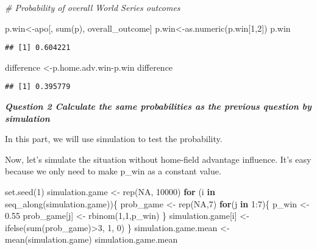 \documentclass[
]{article}
\newenvironment{Shaded}{\begin{snugshade}}{\end{snugshade}}
\newcommand{\CommentTok}[1]{\textcolor[rgb]{0.56,0.35,0.01}{\textit{#1}}}
\newcommand{\ConstantTok}[1]{\textcolor[rgb]{0.00,0.00,0.00}{#1}}
\newcommand{\ControlFlowTok}[1]{\textcolor[rgb]{0.13,0.29,0.53}{\textbf{#1}}}
\newcommand{\DecValTok}[1]{\textcolor[rgb]{0.00,0.00,0.81}{#1}}
\newcommand{\FloatTok}[1]{\textcolor[rgb]{0.00,0.00,0.81}{#1}}
\newcommand{\FunctionTok}[1]{\textcolor[rgb]{0.00,0.00,0.00}{#1}}
\newcommand{\NormalTok}[1]{#1}
\newcommand{\OtherTok}[1]{\textcolor[rgb]{0.56,0.35,0.01}{#1}}
\newcommand{\SpecialCharTok}[1]{\textcolor[rgb]{0.00,0.00,0.00}{#1}}
\begin{document}
\begin{Shaded}
\begin{Highlighting}[]
\CommentTok{\# Probability of overall World Series outcomes}

\NormalTok{p.win}\OtherTok{\textless{}{-}}\NormalTok{apo[, }\FunctionTok{sum}\NormalTok{(p), overall\_outcome]}
\NormalTok{p.win}\OtherTok{\textless{}{-}}\FunctionTok{as.numeric}\NormalTok{(p.win[}\DecValTok{1}\NormalTok{,}\DecValTok{2}\NormalTok{])}
\NormalTok{p.win}
\end{Highlighting}
\end{Shaded}

\begin{verbatim}
## [1] 0.604221
\end{verbatim}

\begin{Shaded}
\begin{Highlighting}[]
\NormalTok{difference }\OtherTok{\textless{}{-}}\NormalTok{p.home.adv.win}\SpecialCharTok{{-}}\NormalTok{p.win}
\NormalTok{difference }
\end{Highlighting}
\end{Shaded}

\begin{verbatim}
## [1] 0.395779
\end{verbatim}

\textbf{\emph{Question 2 Calculate the same probabilities as the
previous question by simulation}}

In this part, we will use simulation to test the probability.

Now, let's simulate the situation without home-field advantage
influence. It's easy because we only need to make p\_win as a constant
value.

\begin{Shaded}
\begin{Highlighting}[]
\FunctionTok{set.seed}\NormalTok{(}\DecValTok{1}\NormalTok{)}
\NormalTok{simulation.game }\OtherTok{\textless{}{-}} \FunctionTok{rep}\NormalTok{(}\ConstantTok{NA}\NormalTok{, }\DecValTok{10000}\NormalTok{)}
\ControlFlowTok{for}\NormalTok{ (i }\ControlFlowTok{in} \FunctionTok{seq\_along}\NormalTok{(simulation.game))\{}
\NormalTok{  prob\_game }\OtherTok{\textless{}{-}} \FunctionTok{rep}\NormalTok{(}\ConstantTok{NA}\NormalTok{,}\DecValTok{7}\NormalTok{)}
  \ControlFlowTok{for}\NormalTok{(j }\ControlFlowTok{in} \DecValTok{1}\SpecialCharTok{:}\DecValTok{7}\NormalTok{)\{}
\NormalTok{    p\_win }\OtherTok{\textless{}{-}} \FloatTok{0.55}
\NormalTok{    prob\_game[j] }\OtherTok{\textless{}{-}} \FunctionTok{rbinom}\NormalTok{(}\DecValTok{1}\NormalTok{,}\DecValTok{1}\NormalTok{,p\_win)}
\NormalTok{  \}}
\NormalTok{  simulation.game[i] }\OtherTok{\textless{}{-}} \FunctionTok{ifelse}\NormalTok{(}\FunctionTok{sum}\NormalTok{(prob\_game)}\SpecialCharTok{\textgreater{}}\DecValTok{3}\NormalTok{, }\DecValTok{1}\NormalTok{, }\DecValTok{0}\NormalTok{)}
\NormalTok{\}}
\NormalTok{simulation.game.mean }\OtherTok{\textless{}{-}} \FunctionTok{mean}\NormalTok{(simulation.game)}
\NormalTok{simulation.game.mean}
\end{Highlighting}
\end{Shaded}
\end{document}
